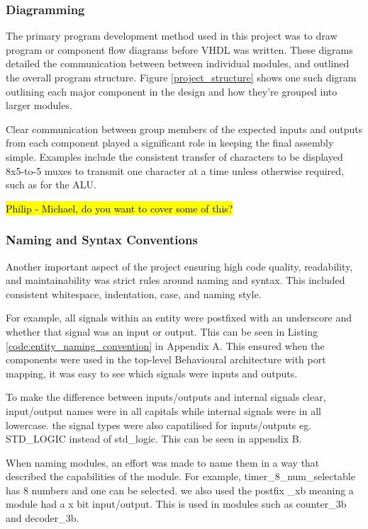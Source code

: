 \documentclass[11pt]{article}
\begin{document}
\subsubsection{Diagramming}

The primary program development method used in this project was to draw program or component flow diagrams before VHDL was written. These digrams detailed the communication between between individual modules, and outlined the overall program structure. Figure \ref{project_structure} shows one such digram outlining each major component in the design and how they're grouped into larger modules. 

Clear communication between group members of the expected inputs and outputs from each component played a significant role in keeping the final assembly simple. Examples include the consistent transfer of characters to be displayed 8x5-to-5 muxes to transmit one character at a time unless otherwise required, such as for the ALU.

\hl{Philip - Michael, do you want to cover some of this?}

\subsubsection{Naming and Syntax Conventions}

Another important aspect of the project ensuring high code quality, readability, and maintainability was strict rules around naming and syntax. This included consistent whitespace, indentation, case, and naming style. 

For example, all signals within an entity were postfixed with an underscore and whether that signal was an input or output. This can be seen in Listing \ref{code:entity_naming_convention} in Appendix A. This ensured when the components were used in the top-level Behavioural architecture with port mapping, it was easy to see which signals were inputs and outputs.

To make the difference between inputs/outputs and internal signals clear, input/output names were in all capitals while internal signals were in all lowercase. the signal types were also capatilised for inputs/outputs eg. STD_LOGIC instead of std_logic. This can be seen in appendix B.

When naming modules, an effort was made to name them in a way that described the capabilities of the module. For example,  timer_8_num_selectable has 8 numbers and one can be selected. we also used the postfix _xb meaning a module had a x bit input/output. This is used in modules such as counter_3b and decoder_3b.
\end{document}

